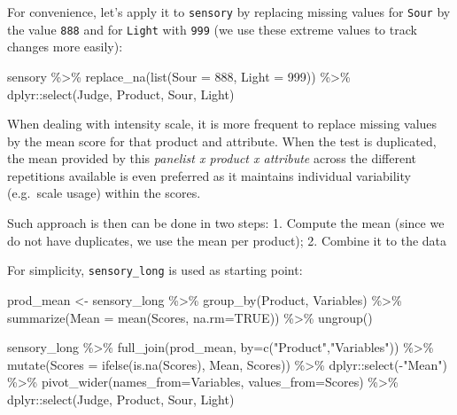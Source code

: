 \documentclass[
]{book}
\newenvironment{Shaded}{\begin{snugshade}}{\end{snugshade}}
\newcommand{\AttributeTok}[1]{\textcolor[rgb]{0.77,0.63,0.00}{#1}}
\newcommand{\ConstantTok}[1]{\textcolor[rgb]{0.00,0.00,0.00}{#1}}
\newcommand{\DecValTok}[1]{\textcolor[rgb]{0.00,0.00,0.81}{#1}}
\newcommand{\FunctionTok}[1]{\textcolor[rgb]{0.00,0.00,0.00}{#1}}
\newcommand{\NormalTok}[1]{#1}
\newcommand{\OtherTok}[1]{\textcolor[rgb]{0.56,0.35,0.01}{#1}}
\newcommand{\SpecialCharTok}[1]{\textcolor[rgb]{0.00,0.00,0.00}{#1}}
\newcommand{\StringTok}[1]{\textcolor[rgb]{0.31,0.60,0.02}{#1}}
\begin{document}
For convenience, let's apply it to \texttt{sensory} by replacing missing values for \texttt{Sour} by the value \texttt{888} and for \texttt{Light} with \texttt{999} (we use these extreme values to track changes more easily):

\begin{Shaded}
\begin{Highlighting}[]
\NormalTok{sensory }\SpecialCharTok{\%\textgreater{}\%} 
  \FunctionTok{replace\_na}\NormalTok{(}\FunctionTok{list}\NormalTok{(}\AttributeTok{Sour =} \DecValTok{888}\NormalTok{, }\AttributeTok{Light =} \DecValTok{999}\NormalTok{)) }\SpecialCharTok{\%\textgreater{}\%} 
\NormalTok{  dplyr}\SpecialCharTok{::}\FunctionTok{select}\NormalTok{(Judge, Product, Sour, Light)}
\end{Highlighting}
\end{Shaded}

When dealing with intensity scale, it is more frequent to replace missing values by the mean score for that product and attribute. When the test is duplicated, the mean provided by this \emph{panelist x product x attribute} across the different repetitions available is even preferred as it maintains individual variability (e.g.~scale usage) within the scores.

Such approach is then can be done in two steps:
1. Compute the mean (since we do not have duplicates, we use the mean per product);
2. Combine it to the data

For simplicity, \texttt{sensory\_long} is used as starting point:

\begin{Shaded}
\begin{Highlighting}[]
\NormalTok{prod\_mean }\OtherTok{\textless{}{-}}\NormalTok{ sensory\_long }\SpecialCharTok{\%\textgreater{}\%} 
  \FunctionTok{group\_by}\NormalTok{(Product, Variables) }\SpecialCharTok{\%\textgreater{}\%} 
  \FunctionTok{summarize}\NormalTok{(}\AttributeTok{Mean =} \FunctionTok{mean}\NormalTok{(Scores, }\AttributeTok{na.rm=}\ConstantTok{TRUE}\NormalTok{)) }\SpecialCharTok{\%\textgreater{}\%} 
  \FunctionTok{ungroup}\NormalTok{()}

\NormalTok{sensory\_long }\SpecialCharTok{\%\textgreater{}\%} 
  \FunctionTok{full\_join}\NormalTok{(prod\_mean, }\AttributeTok{by=}\FunctionTok{c}\NormalTok{(}\StringTok{"Product"}\NormalTok{,}\StringTok{"Variables"}\NormalTok{)) }\SpecialCharTok{\%\textgreater{}\%} 
  \FunctionTok{mutate}\NormalTok{(}\AttributeTok{Scores =} \FunctionTok{ifelse}\NormalTok{(}\FunctionTok{is.na}\NormalTok{(Scores), Mean, Scores)) }\SpecialCharTok{\%\textgreater{}\%} 
\NormalTok{  dplyr}\SpecialCharTok{::}\FunctionTok{select}\NormalTok{(}\SpecialCharTok{{-}}\StringTok{"Mean"}\NormalTok{) }\SpecialCharTok{\%\textgreater{}\%} 
  \FunctionTok{pivot\_wider}\NormalTok{(}\AttributeTok{names\_from=}\NormalTok{Variables, }\AttributeTok{values\_from=}\NormalTok{Scores) }\SpecialCharTok{\%\textgreater{}\%} 
\NormalTok{  dplyr}\SpecialCharTok{::}\FunctionTok{select}\NormalTok{(Judge, Product, Sour, Light)}
\end{Highlighting}
\end{Shaded}
\end{document}
